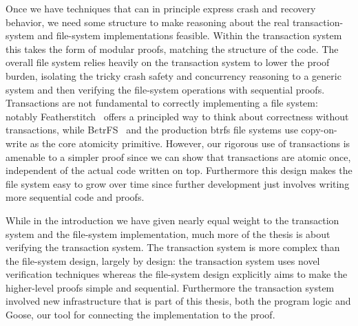 Once we have techniques that can in principle express crash and recovery
behavior, we need some structure to make reasoning about the real
transaction-system and file-system implementations feasible. Within the
transaction system this takes the form of modular proofs, matching the structure
of the code. The overall file system relies heavily on the transaction system to
lower the proof burden, isolating the tricky crash safety and concurrency
reasoning to a generic system and then verifying the file-system operations with
sequential proofs. Transactions are not fundamental to correctly implementing a
file system: notably Featherstitch~\cite{frost:featherstitch} offers a
principled way to think about correctness without transactions, while
B$e$trFS~\cite{jannen:betrfs} and the production btrfs file systems use
copy-on-write as the core atomicity primitive. However, our rigorous use of
transactions is amenable to a simpler proof since we can show that transactions
are atomic once, independent of the actual code written on top. Furthermore this
design makes the file system easy to grow over time since further development
just involves writing more sequential code and proofs.

While in the introduction we have given nearly equal weight to the transaction
system and the file-system implementation, much more of the thesis is about
verifying the transaction system. The transaction system is more complex than
the file-system design, largely by design: the transaction system uses novel
verification techniques whereas the file-system
design explicitly aims to make the higher-level proofs simple and sequential.
Furthermore the transaction system involved new infrastructure that is part of
this thesis, both the program logic and Goose, our tool for connecting the
implementation to the proof.
